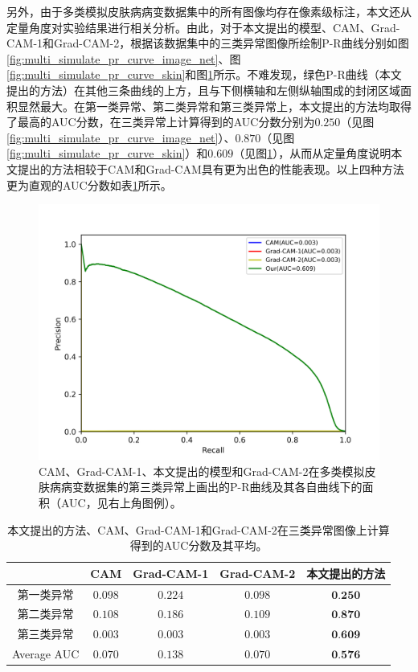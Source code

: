 另外，由于多类模拟皮肤病病变数据集中的所有图像均存在像素级标注，本文还从定量角度对实验结果进行相关分析。由此，对于本文提出的模型、CAM、Grad-CAM-1和Grad-CAM-2，根据该数据集中的三类异常图像所绘制P-R曲线分别如图\ref{fig:multi_simulate_pr_curve_image_net}、图\ref{fig:multi_simulate_pr_curve_skin}和图\ref{fig:multi_simulate_pr_curve_circle}所示。不难发现，绿色P-R曲线（本文提出的方法）在其他三条曲线的上方，且与下侧横轴和左侧纵轴围成的封闭区域面积显然最大。在第一类异常、第二类异常和第三类异常上，本文提出的方法均取得了最高的AUC分数，在三类异常上计算得到的AUC分数分别为$0.250$（见图\ref{fig:multi_simulate_pr_curve_image_net}）、$0.870$（见图\ref{fig:multi_simulate_pr_curve_skin}）和$0.609$（见图\ref{fig:multi_simulate_pr_curve_circle}），从而从定量角度说明本文提出的方法相较于CAM和Grad-CAM具有更为出色的性能表现。以上四种方法更为直观的AUC分数如表\ref{tab:multi_ds_auc_scores}所示。

\begin{figure}[!htbp]
	\centering
	\includegraphics[width=1.0\textwidth]{figure/pr_curve_multi_skin/CIRCLE_pr_curve.png}
	\caption{CAM、Grad-CAM-1、本文提出的模型和Grad-CAM-2在多类模拟皮肤病病变数据集的第三类异常上画出的P-R曲线及其各自曲线下的面积（AUC，见右上角图例）。} 
	\label{fig:multi_simulate_pr_curve_circle}
\end{figure}

\begin{table}[!htbp]
	\centering
	\caption{本文提出的方法、CAM、Grad-CAM-1和Grad-CAM-2在三类异常图像上计算得到的AUC分数及其平均。}
	\label{tab:multi_ds_auc_scores}
	\begin{tabular}{c|c|c|c|c}
		\toprule[2pt]
		& CAM & Grad-CAM-1 & Grad-CAM-2 & 本文提出的方法 \\
		\midrule[2pt]
		第一类异常&$0.098$ & $0.224$ &  $0.098$ & $\textbf{0.250}$ \\ \hline
		第二类异常&  $0.108$ &$0.186$ & $0.109$ & $\textbf{0.870}$ \\ \hline
		第三类异常 & $0.003$ & $0.003$ & $0.003$ & $\textbf{0.609}$ \\ \hline
		Average AUC & $0.070$ & $0.138$ & $0.070$ & $\textbf{0.576}$ \\ 
		\bottomrule[2pt]
	\end{tabular}
\end{table}

